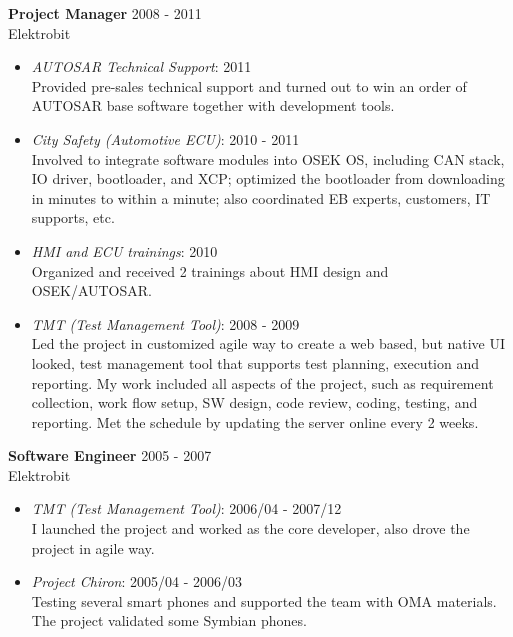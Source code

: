 \textbf{Project Manager} \hfill 2008 - 2011\\
        Elektrobit
        \begin{itemize}  \itemsep -2pt %
            \item {\em AUTOSAR Technical Support}: 2011 \\
                    Provided pre-sales technical support
                    and turned out to win an order of AUTOSAR base software together with development tools.
            \item {\em City Safety (Automotive ECU)}: 2010 - 2011 \\
                    Involved to integrate software modules into OSEK OS,
                    including CAN stack, IO driver, bootloader, and XCP;
                    optimized the bootloader from downloading in minutes to within a minute;
                    also coordinated EB experts, customers, IT supports, etc.
            \item {\em HMI and ECU trainings}: 2010\\
                Organized and received 2 trainings about HMI design and OSEK/AUTOSAR.
            \item {\em TMT (Test Management Tool)}: 2008 - 2009 \\
                    Led the project in customized agile way
                    to create a web based, but native UI looked, test management tool
                    that supports test planning, execution and reporting.
                    My work included all aspects of the project,
                    such as requirement collection, work flow setup, SW design, code review, coding, testing, and reporting.
                    Met the schedule by updating the server online every 2 weeks.
        \end{itemize}
 
\textbf{Software Engineer} \hfill 2005 - 2007 \\
        Elektrobit
        \begin{itemize}  \itemsep -2pt %
            \item {\em TMT (Test Management Tool)}: 2006/04 - 2007/12 \\ 
            I launched the project and worked as the core developer, also drove
            the project in agile way.
            \item {\em Project Chiron}: 2005/04 - 2006/03 \\
                Testing several smart phones and supported the team with OMA materials.
                The project validated some Symbian phones.
        \end{itemize}
 
